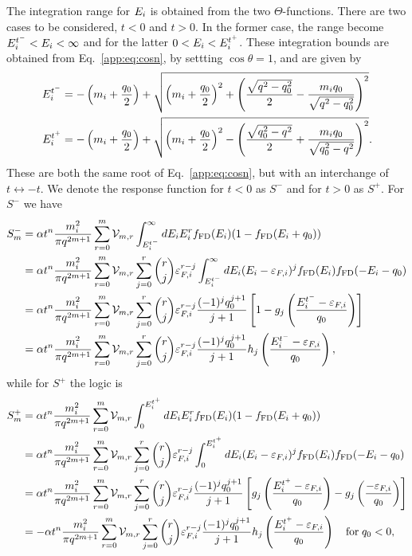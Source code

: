 The integration range for $E_i$ is obtained from the two $\Theta$-functions. There are two cases to be considered, $t<0$ and $t>0$. In the former case, the range become $E_i^{t^-}<E_i<\infty$ and for the latter $0<E_i<E_i^{t^+}$. These integration bounds are obtained from Eq.~\ref{app:eq:cosn}, by settting $\cos\theta = 1$, and are given by
\begin{align}
    E_i^{t^-} & = -\left( m_i+\frac{q_0}{2}\right) + \sqrt{\left( m_i+\frac{q_0}{2}\right)^2 + \left( \frac{\sqrt{q^2 - q_0^2}}{2} - \frac{m_i q_0}{\sqrt{q^2 - q_0^2}}\right)^2}\\
    E_i^{t^+} & = -\left( m_i+\frac{q_0}{2}\right) + \sqrt{\left( m_i+\frac{q_0}{2}\right)^2 - \left( \frac{\sqrt{q_0^2 - q^2}}{2} + \frac{m_i q_0}{\sqrt{q_0^2 - q^2}}\right)^2}.
\end{align}
These are both the same root of Eq.~\ref{app:eq:cosn}, but with an interchange of $t\leftrightarrow -t$. We denote the response function for $t<0$ as $S^-$ and for $t>0$ as $S^+$. For $S^-$ we have
\begin{align}
    S^-_m & = \alpha t^n \frac{m_i^2}{\pi q^{2m + 1}}\sum_{r=0}^m \mathcal{V}_{m,r}\int_{E_i^{t^-}}^\infty dE_i E_i^r f_{\rm FD}(E_i)(1 - f_{\rm FD}(E_i +q_0))\\
    & = \alpha t^n \frac{m_i^2}{\pi q^{2m + 1}}\sum_{r=0}^m \mathcal{V}_{m,r} \sum_{j = 0}^r \binom{r}{j} \varepsilon_{F,i}^{r-j}\int_{E_i^{t^-}}^\infty dE_i (E_i - \varepsilon_{F,i})^j f_{\rm FD}(E_i)f_{\rm FD}(-E_i - q_0)\\
    & =  \alpha t^n \frac{m_i^2}{\pi q^{2m + 1}}\sum_{r=0}^m \mathcal{V}_{m,r} \sum_{j = 0}^r \binom{r}{j} \varepsilon_{F,i}^{r-j}  \frac{(-1)^{j} q_0^{j+1}}{j+1}\left[ 1 - g_j\left( \frac{E_i^{t^-} - \varepsilon_{F,i}}{q_0}\right) \right]\\
    & =  \alpha t^n \frac{m_i^2}{\pi q^{2m + 1}}\sum_{r=0}^m \mathcal{V}_{m,r} \sum_{j = 0}^r \binom{r}{j} \varepsilon_{F,i}^{r-j}  \frac{(-1)^{j} q_0^{j+1}}{j+1} h_j\left( \frac{E_i^{t^-} - \varepsilon_{F,i}}{q_0}\right),
\end{align}
while for $S^+$ the logic is
\begin{align}
    S^+_m & = \alpha t^n \frac{m_i^2}{\pi q^{2m + 1}}\sum_{r=0}^m \mathcal{V}_{m,r}\int_{0}^{E_i^{t^+}} dE_i E_i^r f_{\rm FD}(E_i)(1 - f_{\rm FD}(E_i +q_0))\\
    & = \alpha t^n \frac{m_i^2}{\pi q^{2m + 1}}\sum_{r=0}^m \mathcal{V}_{m,r} \sum_{j = 0}^r \binom{r}{j} \varepsilon_{F,i}^{r-j}\int_{0}^{E_i^{t^+}} dE_i (E_i - \varepsilon_{F,i})^j f_{\rm FD}(E_i)f_{\rm FD}(-E_i - q_0)\\
    & =  \alpha t^n \frac{m_i^2}{\pi q^{2m + 1}}\sum_{r=0}^m \mathcal{V}_{m,r} \sum_{j = 0}^r \binom{r}{j} \varepsilon_{F,i}^{r-j}  \frac{(-1)^{j} q_0^{j+1}}{j+1}\left[ g_j\left( \frac{E_i^{t^+} - \varepsilon_{F,i}}{q_0}\right) -  g_j\left( \frac{ - \varepsilon_{F,i}}{q_0}\right) \right]\\
    & =  -\alpha t^n \frac{m_i^2}{\pi q^{2m + 1}}\sum_{r=0}^m \mathcal{V}_{m,r} \sum_{j = 0}^r \binom{r}{j} \varepsilon_{F,i}^{r-j}  \frac{(-1)^{j} q_0^{j+1}}{j+1} h_j\left( \frac{E_i^{t^+} - \varepsilon_{F,i}}{q_0}\right)\quad \textrm{for}\; q_0<0,
\end{align}
